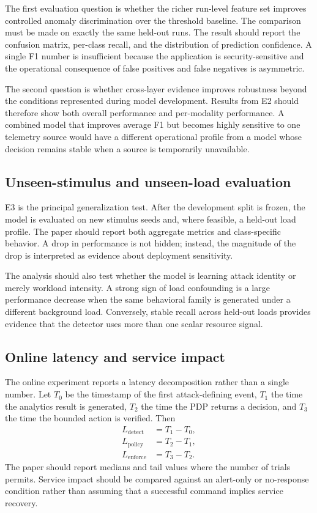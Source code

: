 \documentclass[sigconf,review]{acmart}
\begin{document}
The first evaluation question is whether the richer run-level feature set improves controlled anomaly discrimination over the threshold baseline. The comparison must be made on exactly the same held-out runs. The result should report the confusion matrix, per-class recall, and the distribution of prediction confidence. A single F1 number is insufficient because the application is security-sensitive and the operational consequence of false positives and false negatives is asymmetric.

The second question is whether cross-layer evidence improves robustness beyond the conditions represented during model development. Results from E2 should therefore show both overall performance and per-modality performance. A combined model that improves average F1 but becomes highly sensitive to one telemetry source would have a different operational profile from a model whose decision remains stable when a source is temporarily unavailable.

\subsection{Unseen-stimulus and unseen-load evaluation}
E3 is the principal generalization test. After the development split is frozen, the model is evaluated on new stimulus seeds and, where feasible, a held-out load profile. The paper should report both aggregate metrics and class-specific behavior. A drop in performance is not hidden; instead, the magnitude of the drop is interpreted as evidence about deployment sensitivity.

The analysis should also test whether the model is learning attack identity or merely workload intensity. A strong sign of load confounding is a large performance decrease when the same behavioral family is generated under a different background load. Conversely, stable recall across held-out loads provides evidence that the detector uses more than one scalar resource signal.

\subsection{Online latency and service impact}
The online experiment reports a latency decomposition rather than a single number. Let $T_0$ be the timestamp of the first attack-defining event, $T_1$ the time the analytics result is generated, $T_2$ the time the PDP returns a decision, and $T_3$ the time the bounded action is verified. Then
\begin{align}
L_{\mathrm{detect}} &= T_1-T_0,\\
L_{\mathrm{policy}} &= T_2-T_1,\\
L_{\mathrm{enforce}} &= T_3-T_2.
\end{align}
The paper should report medians and tail values where the number of trials permits. Service impact should be compared against an alert-only or no-response condition rather than assuming that a successful command implies service recovery.
\end{document}

